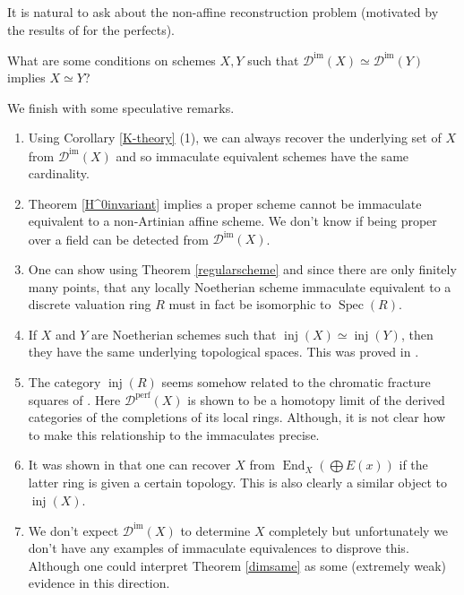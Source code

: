 \documentclass[12pt,oneside]{amsart}
\DeclareMathOperator{\End}{End}
\DeclareMathOperator{\perf}{perf}
\DeclareMathOperator{\inj}{inj}
\DeclareMathOperator{\immac}{im}
\DeclareMathOperator{\Spec}{Spec}
\begin{document}
It is natural to ask about the non-affine reconstruction problem (motivated by the results of \cite{BO01} for the perfects). 

\begin{quest} \label{recoverscheme}
What are some conditions on schemes $X,Y$ such that $\mathcal{D}^{\immac}(X) \simeq \mathcal{D}^{\immac}(Y)$ implies $X \simeq Y$?
\end{quest}


\begin{remark} We finish with some speculative remarks.
\begin{enumerate}
\item Using Corollary \ref{K-theory} (1), we can always recover the underlying set of $X$ from $\mathcal{D}^{\immac}(X)$ and so  immaculate equivalent schemes have the same cardinality.

\item Theorem \ref{H^0invariant} implies a proper scheme cannot be immaculate equivalent to a non-Artinian affine scheme. We don't know if being proper over a field can be detected from $\mathcal{D}^{\immac}(X)$. 

\item One can show using Theorem \ref{regularscheme} and since there are only finitely many points, that any locally Noetherian scheme immaculate equivalent to a discrete valuation ring $R$ must in fact be isomorphic to $\Spec(R)$. 

\item If $X$ and $Y$ are Noetherian schemes such that $\inj(X) \simeq \inj(Y)$, then they have the same underlying topological spaces. This was proved in \cite[VI.3]{Gab62}.

\item The category $\inj(R)$ seems somehow related to the chromatic fracture squares of \cite{GB20}. Here $\mathcal{D}^{\perf}(X)$ is shown to be a homotopy limit of the derived categories of the completions of its local rings. Although, it is not clear how to make this relationship to the immaculates precise. 

\item It was shown in \cite[Theorem 6]{Roos69} that one can recover $X$ from $\End_X(\bigoplus E(x))$ if the latter ring is given a certain topology. This is also clearly a similar object to $\inj(X)$. 

\item We don't expect $\mathcal{D}^{\immac}(X)$ to determine $X$ completely but unfortunately we don't have any examples of immaculate equivalences to disprove this. Although one could interpret Theorem \ref{dimsame} as some (extremely weak) evidence in this direction.
\end{enumerate}
\end{remark}
\end{document}

